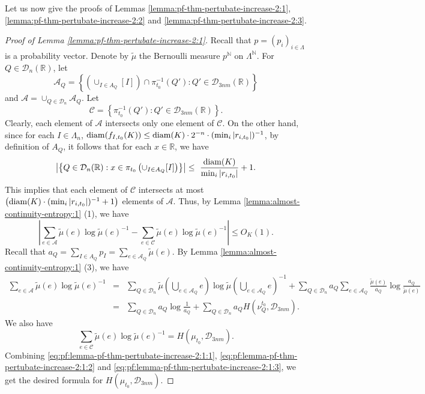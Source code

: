 \documentclass[a4paper,11pt]{amsart}
\theoremstyle{definition}
\numberwithin{equation}{section}
\def\D{\mathcal{D}}
\def\N{\mathbb N}
\def\R{\mathbb R}
\begin{document}
Let us now give the proofs of Lemmas \ref{lemma:pf-thm-pertubate-increase-2:1}, \ref{lemma:pf-thm-pertubate-increase-2:2} and \ref{lemma:pf-thm-pertubate-increase-2:3}.   
\begin{proof}[Proof of Lemma \ref{lemma:pf-thm-pertubate-increase-2:1}]
Recall that $p=(p_i)_{i\in \Lambda}$ is a probability vector.   Denote by $\tilde{\mu}$ the Bernoulli measure $p^\N$ on $\Lambda^\N$.  
For $Q\in \D_n(\R)$, let 
\[
\mathcal{A}_Q=\left\{  \left(\cup_{I\in A_Q}[I]\right)\cap \pi_{t_0}^{-1} (Q'):   Q'\in \D_{3nm}(\R)  \right\}
\]
and $\mathcal{A} = \cup_{Q\in \D_n} \mathcal{A}_Q$. Let 
\[
\mathcal{C} = \left\{  \pi_{t_0}^{-1} (Q'):   Q'\in \D_{3nm}(\R) \right\}.
\]
Clearly, each element of $\mathcal{A}$ intersects only one element  of $\mathcal{C}$. On the other hand, since for each $I\in \Lambda_n$,   ${\rm diam}(f_{I,t_0}(K))\le {\rm diam}(K)\cdot 2^{-n}\cdot (\min_{i}|r_{i,t_0}|)^{-1}$,  by definition of $A_Q$, it follows that for each $x\in \R$, we have 
\[
\left|\left\{Q\in \D_n(\R): x\in \pi_{t_0}\left(\cup_{I\in A_Q}[I]\right)\right\}\right| \le\  \frac{{\rm diam}(K)}{ \min_{i}|r_{i,t_0}|}+1.
\]
This implies that each element of $\mathcal{C}$  intersects  at most $\left({\rm diam}(K)\cdot (\min_{i}|r_{i,t_0}|)^{-1} +1\right)$ elements  of $\mathcal{A}$. 
Thus, by Lemma \ref{lemma:almost-continuity-entropy:1} (1),  we have 
\begin{equation}\label{eq:pf:lemma-pf-thm-pertubate-increase-2:1:1}
\left| \sum_{e\in \mathcal{A}} \tilde{\mu}(e)\log  \tilde{\mu}(e)^{-1} - \sum_{e\in \mathcal{C}} \tilde{\mu}(e)\log  \tilde{\mu}(e)^{-1} \right| \le O_K(1). 
\end{equation}
Recall that $a_Q=\sum_{I\in A_Q}p_I=\sum_{e\in \mathcal{A}_Q}\tilde{\mu}(e)$.
By Lemma \ref{lemma:almost-continuity-entropy:1} (3),   we have 
\begin{eqnarray}
 \sum_{e\in \mathcal{A}} \tilde{\mu}(e)\log  \tilde{\mu}(e)^{-1}  & = & \sum_{Q\in \D_n} \tilde{\mu}\left(\bigcup_{e\in \mathcal{A}_Q}e\right)\log \tilde{\mu}\left(\bigcup_{e\in \mathcal{A}_Q}e\right)^{-1} +   \sum_{Q\in \D_n} a_Q\sum_{e\in \mathcal{A}_Q}\frac{\tilde{\mu}(e)}{a_Q} \log \frac{a_Q}{\tilde{\mu}(e)}\nonumber\\
& = & \sum_{Q\in \D_n}a_Q\log\frac{1}{a_Q} +\sum_{Q\in \D_n} a_Q H(\nu_Q^{t_0},\D_{3nm}). \label{eq:pf:lemma-pf-thm-pertubate-increase-2:1:2}
\end{eqnarray}
We also have 
\begin{equation}\label{eq:pf:lemma-pf-thm-pertubate-increase-2:1:3}
\sum_{e\in \mathcal{C}} \tilde{\mu}(e)\log  \tilde{\mu}(e)^{-1} =H(\mu_{t_0},\D_{3nm}).
\end{equation}
Combining \eqref{eq:pf:lemma-pf-thm-pertubate-increase-2:1:1}, \eqref{eq:pf:lemma-pf-thm-pertubate-increase-2:1:2} and \eqref{eq:pf:lemma-pf-thm-pertubate-increase-2:1:3},   we get the desired formula for $H(\mu_{t_0},\D_{3nm})$.  


\end{proof}
\end{document}
